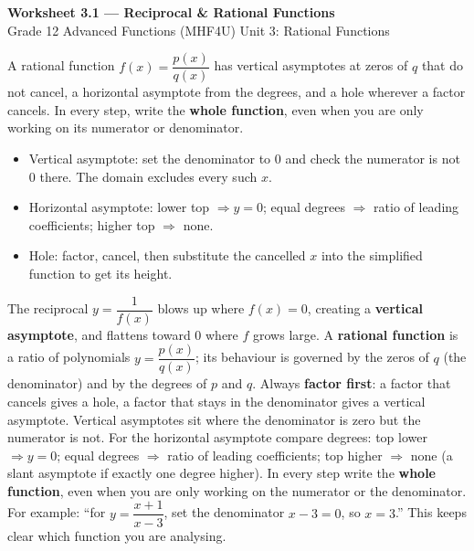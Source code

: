 \documentclass[11pt]{article}
\begin{document}
\begin{center}
{\LARGE\bfseries\color{titleblue}Worksheet 3.1 --- Reciprocal \& Rational Functions}\\[2pt]
{\small Grade 12 Advanced Functions (MHF4U) \textperiodcentered{} Unit 3: Rational Functions}
\end{center}

\begin{ideabox}
A rational function $f(x)=\dfrac{p(x)}{q(x)}$ has vertical asymptotes at zeros of $q$ that do not cancel, a horizontal asymptote from the degrees, and a hole wherever a factor cancels. In every step, write the \textbf{whole function}, even when you are only working on its numerator or denominator.
\begin{itemize}[leftmargin=*,itemsep=2pt]
  \item Vertical asymptote: set the denominator to $0$ and check the numerator is not $0$ there. The domain excludes every such $x$.
  \item Horizontal asymptote: lower top $\Rightarrow y=0$; equal degrees $\Rightarrow$ ratio of leading coefficients; higher top $\Rightarrow$ none.
  \item Hole: factor, cancel, then substitute the cancelled $x$ into the simplified function to get its height.
\end{itemize}
\end{ideabox}

\begin{learnbox}
The reciprocal $y=\dfrac{1}{f(x)}$ blows up where $f(x)=0$, creating a \textbf{vertical asymptote}, and flattens toward $0$ where $f$ grows large.
A \textbf{rational function} is a ratio of polynomials $y=\dfrac{p(x)}{q(x)}$; its behaviour is governed by the zeros of $q$ (the denominator) and by the degrees of $p$ and $q$. Always \textbf{factor first}: a factor that cancels gives a hole, a factor that stays in the denominator gives a vertical asymptote.
Vertical asymptotes sit where the denominator is zero but the numerator is not. For the horizontal asymptote compare degrees: top lower $\Rightarrow y=0$; equal degrees $\Rightarrow$ ratio of leading coefficients; top higher $\Rightarrow$ none (a slant asymptote if exactly one degree higher).
In every step write the \textbf{whole function}, even when you are only working on the numerator or the denominator. For example: ``for $y=\dfrac{x+1}{x-3}$, set the denominator $x-3=0$, so $x=3$.'' This keeps clear which function you are analysing.
\end{learnbox}
\end{document}
